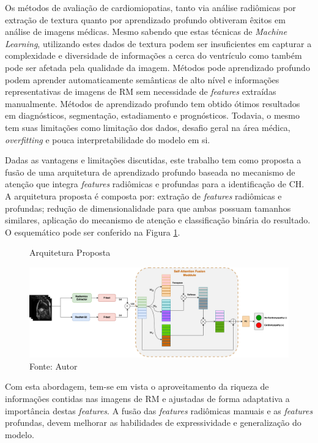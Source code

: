 Os métodos de avaliação de cardiomiopatias, tanto via análise radiômicas por extração de textura quanto por aprendizado profundo obtiveram êxitos em análise de imagens médicas. Mesmo sabendo que estas técnicas de \textit{Machine Learning}, utilizando estes dados de textura podem ser insuficientes em capturar a complexidade e diversidade de informações a cerca do ventrículo como também pode ser afetada pela qualidade da imagem. Métodos pode aprendizado profundo podem aprender automaticamente semânticas de alto nível e informações representativas de imagens de \gls{RM} sem necessidade de \textit{features} extraídas manualmente.
Métodos de aprendizado profundo tem obtido ótimos resultados em diagnósticos, segmentação, estadiamento e prognósticos. Todavia, o mesmo tem suas limitações como limitação dos dados, desafio geral na área médica, \textit{overfitting} e pouca interpretabilidade do modelo em si.

Dadas as vantagens e limitações discutidas, este trabalho tem como proposta a fusão de uma arquitetura de aprendizado profundo baseada no mecanismo de atenção que integra \textit{features} radiômicas e profundas para a identificação de \gls{CH}. A arquitetura proposta é composta por: extração de \textit{features} radiômicas e profundas; redução de dimensionalidade para que ambas possuam tamanhos similares, aplicação do mecanismo de atenção e classificação binária do resultado. O esquemático pode ser conferido na Figura \ref{fig:fig011-01}.

\begin{figure}[htbp]
    \centering
    \caption{Arquitetura Proposta}
    \includegraphics[width=1\textwidth]{figures/fig011.png}
    \caption*{Fonte: Autor}
    \label{fig:fig011-01}
\end{figure}

Com esta abordagem, tem-se em vista o aproveitamento da riqueza de informações contidas nas imagens de \gls{RM} e ajustadas de forma adaptativa a importância destas \textit{features}. A fusão das \textit{features} radiômicas manuais e as \textit{features} profundas, devem melhorar as habilidades de expressividade e generalização do modelo. 

